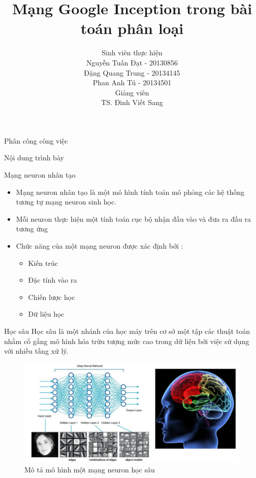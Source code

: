 \documentclass[compress]{beamer}
\title[Mạng Google Inception]{Mạng Google Inception trong bài toán phân loại}
\author[Nguyễn Tuấn Đạt, Đặng Quang Trung, Phan Anh Tú]{
Sinh viên thực hiện\\
Nguyễn Tuấn Đạt - 20130856\\
Đặng Quang Trung - 20134145\\
Phan Anh Tú - 20134501 \\[0.4cm]
Giảng viên \\
TS. Đinh Viết Sang 
}
\begin{document}
 
\begin{frame}
\titlepage
\end{frame} 

\begin{frame}{Phân công công việc}

\end{frame}
  
   
\begin{frame}{Nội dung trình bày}
\tableofcontents
\end{frame}
\begin{frame}{Mạng neuron nhân tạo}
\begin{itemize}
\item Mạng neuron nhân tạo là một mô hình tính toán mô phỏng các hệ thống tương tự mạng neuron sinh học.
\item Mỗi neuron thực hiện một tính toán cục bộ nhận đầu vào và đưa ra đầu ra tương ứng
\item  Chức năng của một  mạng neuron được xác định bởi :
\begin{itemize}
\item Kiến trúc
\item Đặc tính vào ra
\item Chiến lược học
\item Dữ liệu học 
\end{itemize}
\end{itemize}
\end{frame}
\begin{frame}{Học sâu}
Học sâu là một nhánh của học máy trên cơ sở một tập các thuật toán nhằm cố gắng mô hình hóa trừu tượng mức cao trong dữ liệu bởi việc sử dụng với nhiều tầng xử lý. \\
\begin{figure}[H]
\includegraphics[scale=0.3]{deeplearning.png}
\caption{Mô tả mô hình một mạng neuron học sâu}
\end{figure}
\end{frame}
\end{document}
